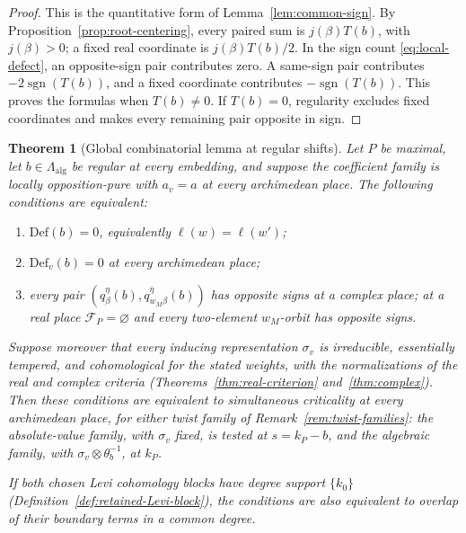 \documentclass[12pt]{amsart}
\numberwithin{equation}{section}
\theoremstyle{plain}
\newtheorem{theorem}{Theorem}[section]
\theoremstyle{definition}
\theoremstyle{remark}
\renewcommand{\bar}{\overline}
\newcommand{\Def}{\mathrm{Def}}
\begin{document}
\begin{proof}
This is the quantitative form of Lemma~\ref{lem:common-sign}. By Proposition~\ref{prop:root-centering}, every paired sum is $j(\beta)T(b)$, with $j(\beta)>0$; a fixed real coordinate is $j(\beta)T(b)/2$. In the sign count \eqref{eq:local-defect}, an opposite-sign pair contributes zero. A same-sign pair contributes $-2\operatorname{sgn}(T(b))$, and a fixed coordinate contributes $-\operatorname{sgn}(T(b))$. This proves the formulas when $T(b)\ne0$. If $T(b)=0$, regularity excludes fixed coordinates and makes every remaining pair opposite in sign.
\end{proof}

\begin{theorem}[Global combinatorial lemma at regular shifts]\label{thm:global-converse}\label{thm:intro-global}
Let $P$ be maximal, let $b\in\Lambda_{\mathrm{alg}}$ be regular at every embedding, and suppose the coefficient family is locally opposition-pure with $a_v=a$ at every archimedean place. The following conditions are equivalent: 
\begin{enumerate}
\item $\Def(b)=0$, equivalently $\ell(w)=\ell(w')$;
\item $\Def_v(b)=0$ at every archimedean place;
\item every pair $(q_\beta^\eta(b),q_{w_M\beta}^{\bar\eta}(b))$ has opposite signs at a complex place; at a real place $\mathcal F_P=\varnothing$ and every two-element $w_M$-orbit has opposite signs.
\end{enumerate}
Suppose moreover that every inducing representation $\sigma_v$ is irreducible, essentially tempered, and cohomological for the stated weights, with the normalizations of the real and complex criteria (Theorems~\ref{thm:real-criterion} and~\ref{thm:complex}). Then these conditions are equivalent to simultaneous criticality at every archimedean place, for either twist family of Remark~\ref{rem:twist-families}: the absolute-value family, with $\sigma_v$ fixed, is tested at $s=k_P-b$, and the algebraic family, with $\sigma_v\otimes\theta_b^{-1}$, at $k_P$.

If both chosen Levi cohomology blocks have degree support $\{k_0\}$ (Definition~\ref{def:retained-Levi-block}), the conditions are also equivalent to overlap of their boundary terms in a common degree.
\end{theorem}
\end{document}
